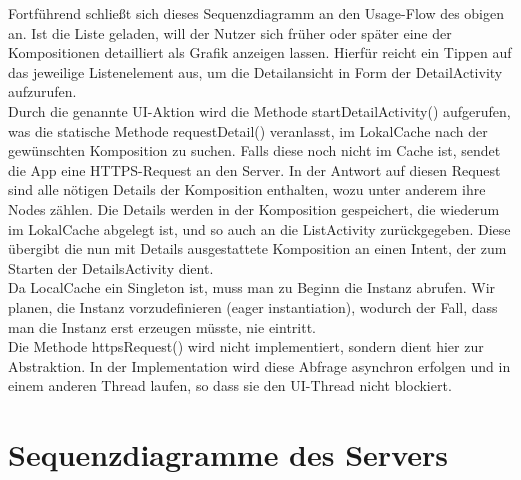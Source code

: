 \noindent Fortführend schließt sich dieses Sequenzdiagramm an den Usage-Flow des obigen an. Ist die Liste geladen, will der Nutzer sich früher oder später eine der Kompositionen  detailliert als Grafik anzeigen lassen. Hierfür reicht ein Tippen auf das jeweilige Listenelement aus, um die Detailansicht in Form der DetailActivity aufzurufen.\newline
\\
Durch die genannte UI-Aktion wird die Methode startDetailActivity() aufgerufen, was die statische Methode requestDetail() veranlasst, im LokalCache nach der gewünschten Komposition zu suchen.
Falls diese noch nicht im Cache ist, sendet die App eine HTTPS-Request an den Server.
In der Antwort auf diesen Request sind alle nötigen Details der Komposition enthalten, wozu unter anderem ihre Nodes zählen.
Die Details werden in der Komposition gespeichert, die wiederum im LokalCache abgelegt ist, und so auch an die ListActivity zurückgegeben. Diese übergibt die nun mit Details ausgestattete Komposition an einen Intent, der zum Starten der DetailsActivity dient.\newline
\\
Da LocalCache ein Singleton ist, muss man zu Beginn die Instanz abrufen. Wir planen, die Instanz vorzudefinieren (eager instantiation), wodurch der Fall, dass man die Instanz erst erzeugen müsste, nie eintritt.\newline
\\ \noindent
Die Methode httpsRequest() wird nicht implementiert, sondern dient hier zur Abstraktion. In der Implementation wird diese Abfrage asynchron erfolgen und in einem anderen Thread laufen, so dass sie den UI-Thread nicht blockiert. 


\pagebreak
\section*{Sequenzdiagramme des Servers}



